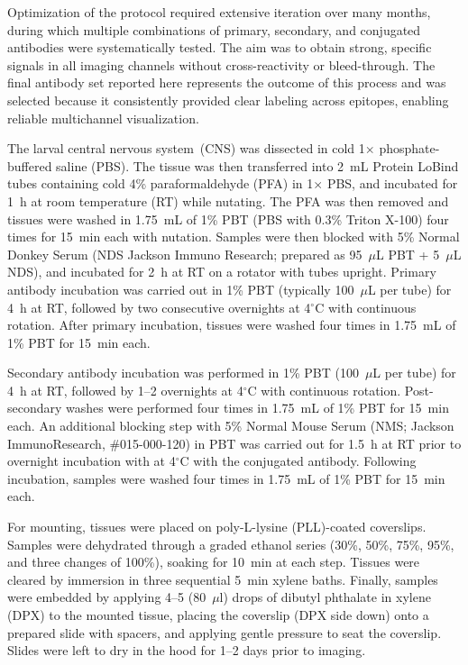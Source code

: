         Optimization of the protocol required extensive iteration over many months, during which multiple combinations of primary, secondary, and conjugated antibodies were systematically tested. The aim was to obtain strong, specific signals in all imaging channels without cross-reactivity or bleed-through. The final antibody set reported here represents the outcome of this process and was selected because it consistently provided clear labeling across epitopes, enabling reliable multichannel visualization.

        The larval central nervous system~(CNS) was dissected in cold 1$\times$ phosphate-buffered saline (PBS). The tissue was then transferred into 2~mL Protein LoBind tubes containing cold 4\% paraformaldehyde (PFA) in 1$\times$ PBS, and incubated for 1~h at room temperature (RT) while nutating. The PFA was then removed and tissues were washed in 1.75~mL of 1\% PBT (PBS with 0.3\% Triton X-100) four times for 15~min each with nutation.  
        Samples were then blocked with 5\% Normal Donkey Serum (NDS Jackson Immuno Research; prepared as 95~$\mu$L PBT + 5~$\mu$L NDS), and incubated for 2~h at RT on a rotator with tubes upright.
        Primary antibody incubation was carried out in 1\% PBT (typically 100~$\mu$L per tube) for 4~h at RT, followed by two consecutive overnights at 4$^\circ$C with continuous rotation.  After primary incubation, tissues were washed four times in 1.75~mL of 1\% PBT for 15~min each.  

        Secondary antibody incubation was performed in 1\% PBT (100~$\mu$L per tube) for 4~h at RT, followed by 1--2 overnights at 4$^\circ$C with continuous rotation. Post-secondary washes were performed four times in 1.75~mL of 1\% PBT for 15~min each. An additional blocking step with 5\% Normal Mouse Serum (NMS; Jackson ImmunoResearch, \#015-000-120) in PBT was carried out for 1.5~h at RT prior to overnight incubation with at 4$^\circ$C with the conjugated antibody. Following incubation, samples were washed four times in 1.75~mL of 1\% PBT for 15~min each.  

        For mounting, tissues were placed on poly-L-lysine (PLL)-coated coverslips. Samples were dehydrated through a graded ethanol series (30\%, 50\%, 75\%, 95\%, and three changes of 100\%), soaking for 10~min at each step. Tissues were cleared by immersion in three sequential 5~min xylene baths. Finally, samples were embedded by applying 4--5 (80~$\mu$l) drops of dibutyl phthalate in xylene (DPX) to the mounted tissue, placing the coverslip (DPX side down) onto a prepared slide with spacers, and applying gentle pressure to seat the coverslip. Slides were left to dry in the hood for 1--2 days prior to imaging.

